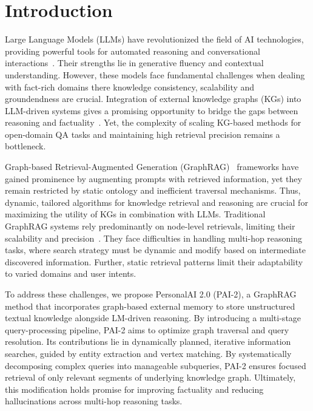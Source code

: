 \section{Introduction}

Large Language Models (LLMs) have revolutionized the field of AI technologies, providing powerful tools for automated reasoning and conversational interactions~\cite{yang2025qwen3technicalreport,deepseekai2025deepseekv3technicalreport,5team2025glm45agenticreasoningcoding}. Their strengths lie in generative fluency and contextual understanding. However, these models face fundamental challenges when dealing with fact-rich domains there knowledge consistency, scalability and groundendness are crucial. Integration of external knowledge graphs (KGs) into LLM-driven systems gives a promising opportunity to bridge the gaps between reasoning and factuality~\cite{chepurova-etal-2026-wikontic,bai2025autoschemakgautonomousknowledgegraph,10.1145/3746027.3755628}. Yet, the complexity of scaling KG-based methods for open-domain QA tasks and maintaining high retrieval precision remains a bottleneck.

Graph-based Retrieval-Augmented Generation (GraphRAG)~\cite{Gao2023RetrievalAugmentedGF , 10.1145/3777378} frameworks have gained prominence by augmenting prompts with retrieved information, yet they remain restricted by static ontology and inefficient traversal mechanisms. Thus, dynamic, tailored algorithms for knowledge retrieval and reasoning are crucial for maximizing the utility of KGs in combination with LLMs. Traditional GraphRAG systems rely predominantly on node-level retrievals, limiting their scalability and precision~\cite{hu-etal-2025-grag,mavromatis-karypis-2025-gnn,luo2024graph}. They face difficulties in handling multi-hop reasoning tasks, where search strategy must be dynamic and modify based on intermediate discovered information. Further, static retrieval patterns limit their adaptability to varied domains and user intents.

To address these challenges, we propose PersonalAI 2.0 (PAI-2), a GraphRAG method that incorporates graph-based external memory to store unstructured textual knowledge alongside LM-driven reasoning. By introducing a multi-stage query-processing pipeline, PAI-2 aims to optimize graph traversal and query resolution. Its contributions lie in dynamically planned, iterative information searches, guided by entity extraction and vertex matching. By systematically decomposing complex queries into manageable subqueries, PAI-2 ensures focused retrieval of only relevant segments of underlying knowledge graph. Ultimately, this modification holds promise for improving factuality and reducing hallucinations across multi-hop reasoning tasks.

